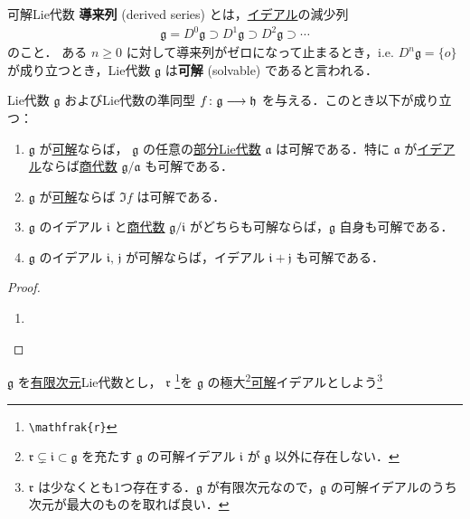 \documentclass[rep_main]{subfiles}
\begin{document}
\begin{mydef}[label=def:solvable-LieAlg]{可解Lie代数}
    \textbf{導来列} (derived series) とは，\hyperref[def:ideal-LieAlg]{イデアル}の減少列
    \begin{align}
        \mathfrak{g} = D^0 \mathfrak{g} \supset D^1 \mathfrak{g} \supset D^2 \mathfrak{g} \supset \cdots
    \end{align}
    のこと．
    ある $n \ge 0$ に対して導来列がゼロになって止まるとき，i.e. $D^n \mathfrak{g} = \{o\}$ が成り立つとき，Lie代数 $\mathfrak{g}$ は\textbf{可解} (solvable) であると言われる．
\end{mydef}

\begin{myprop}[label=prop:solvable-basic]{}
    Lie代数 $\mathfrak{g}$ およびLie代数の準同型 $f \colon \mathfrak{g} \longrightarrow \mathfrak{h}$ を与える．このとき以下が成り立つ：
    \begin{enumerate}
        \item $\mathfrak{g}$ が\hyperref[def:solvable-LieAlg]{可解}ならば，
        $\mathfrak{g}$ の任意の\hyperref[def:subLieAlg]{部分Lie代数} $\mathfrak{a}$ は可解である．特に $\mathfrak{a}$ が\hyperref[def:ideal-LieAlg]{イデアル}ならば\hyperref[def:quotient-LieAlg]{商代数} $\mathfrak{g} / \mathfrak{a}$ も可解である．
        \item $\mathfrak{g}$ が\hyperref[def:solvable-LieAlg]{可解}ならば $\Im f$ は可解である．
        \item $\mathfrak{g}$ のイデアル $\mathfrak{i}$ と\hyperref[def:quotient-LieAlg]{商代数} $\mathfrak{g}/\mathfrak{i}$ がどちらも可解ならば，$\mathfrak{g}$ 自身も可解である．
        \item $\mathfrak{g}$ のイデアル $\mathfrak{i},\, \mathfrak{j}$ が可解ならば，イデアル $\mathfrak{i} + \mathfrak{j}$ も可解である．
    \end{enumerate}
\end{myprop}

\begin{proof}
    \begin{enumerate}
        \item 
    \end{enumerate}
\end{proof}

$\mathfrak{g}$ を\underline{有限次元}Lie代数とし，
$\mathfrak{r}$ \footnote{\texttt{\textbackslash mathfrak\{r\}}}を $\mathfrak{g}$ の極大\footnote{$\mathfrak{r} \subsetneq \mathfrak{i} \subset \mathfrak{g}$ を充たす $\mathfrak{g}$ の可解イデアル $\mathfrak{i}$ が $\mathfrak{g}$ 以外に存在しない．}\hyperref[def:solvable-LieAlg]{可解}イデアルとしよう\footnote{$\mathfrak{r}$ は少なくとも1つ存在する．$\mathfrak{g}$ が有限次元なので，$\mathfrak{g}$ の可解イデアルのうち次元が最大のものを取れば良い．}
\end{document}
